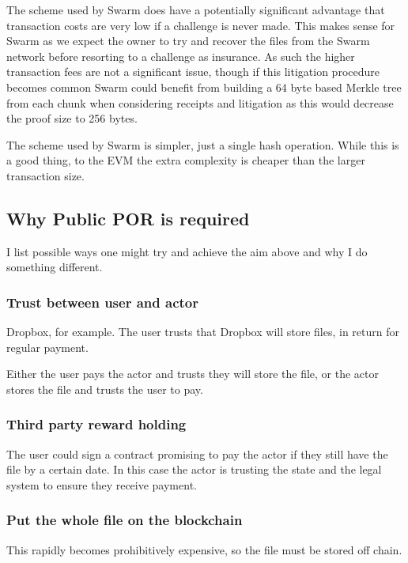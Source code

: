 \documentclass[10pt,twoside,a4paper]{article}
\begin{document}
The scheme used by Swarm does have a potentially significant advantage that transaction costs are very low if a challenge is never made.
This makes sense for Swarm as we expect the owner to try and recover the files from the Swarm network before resorting to a challenge as insurance.
As such the higher transaction fees are not a significant issue, though if this litigation procedure becomes common Swarm could benefit from building a 64 byte based Merkle tree
from each chunk when considering receipts and litigation as this would decrease the proof size to 256 bytes.

The scheme used by Swarm is simpler, just a single hash operation.
While this is a good thing, to the EVM the extra complexity is cheaper than the larger transaction size.


\subsection{Why Public POR is required}

I list possible ways one might try and achieve the aim above and why I do something different.

\subsubsection{Trust between user and actor}

Dropbox, for example.
The user trusts that Dropbox will store files, in return for regular payment.

Either the user pays the actor and trusts they will store the file, or the actor stores the file and trusts the user to pay.

\subsubsection{Third party reward holding}

The user could sign a contract promising to pay the actor if they still have the file by a certain date.
In this case the actor is trusting the state and the legal system to ensure they receive payment.

\subsubsection{Put the whole file on the blockchain}

This rapidly becomes prohibitively expensive, so the file must be stored off chain.
\end{document}
